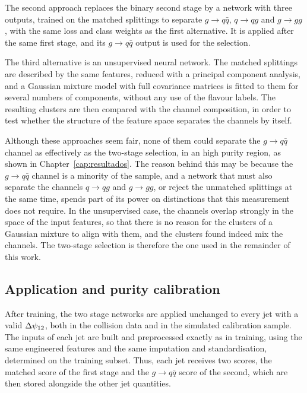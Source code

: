 The second approach replaces the binary second stage by a network with three
outputs, trained on the matched splittings to separate $g \to q\bar{q}$,
$q \to qg$ and $g \to gg$, with the same loss and class weights as the first
alternative. It is applied after the same first stage, and its $g \to q\bar{q}$
output is used for the selection.

The third alternative is an unsupervised neural network. The matched splittings are described by the
same features, reduced with a principal component analysis, and a Gaussian mixture
model with full covariance matrices is fitted to them for several numbers of
components, without any use of the flavour labels. The resulting clusters are then compared
with the channel composition, in order to test whether the structure of
the feature space separates the channels by itself.

Although these approaches seem fair, none of them could separate the $g \to q\bar{q}$ channel as effectively as
the two-stage selection, in an high purity region, as shown in Chapter~\ref{cap:resultados}. The reason behind this
may be because the $g \to q\bar{q}$ channel is a minority
of the sample, and a network that must also separate the channels $q \to qg$ and $g \to gg$,
or reject the unmatched splittings at the same time, spends part of its power on distinctions that this measurement does not require. 
In the unsupervised case, the channels overlap
strongly in the space of the input features, so that there is no reason for the
clusters of a Gaussian mixture to align with them, and the clusters found indeed
mix the channels. The two-stage selection is therefore the one used in the
remainder of this work.

\subsection{Application and purity calibration}
\label{sec:flavour-application}

After training, the two stage networks are applied unchanged to every jet with a valid
$\Delta\psi_{12}$, both in the collision data and in the simulated calibration sample. The
inputs of each jet are built and preprocessed exactly as in training, using the
same engineered features and the same imputation and standardisation, determined
on the training subset. Thus, each jet receives two scores, the matched score of
the first stage and the $g \to q\bar{q}$ score of the second, which are then stored
alongside the other jet quantities.

